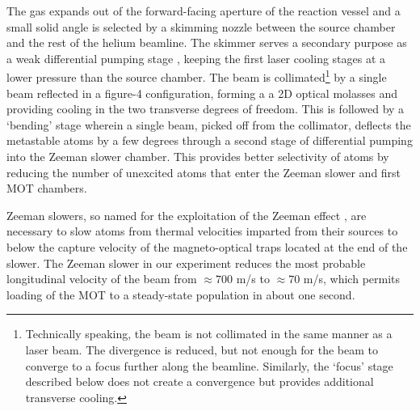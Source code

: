 	The gas expands out of the forward-facing aperture of the reaction vessel and a small solid angle is selected by a skimming nozzle between the source chamber and the rest of the helium beamline.
	The skimmer serves a secondary purpose as a weak differential pumping stage , keeping the first laser cooling stages at a lower pressure than the source chamber.
	The beam is collimated\footnote{Technically speaking, the beam is not collimated in the same manner as a laser beam.
	The divergence is reduced, but not enough for the beam to converge to a focus further along the beamline.
	Similarly, the `focus' stage described below does not create a convergence but provides additional transverse cooling.} by a single beam reflected in a figure-4 configuration, forming a a 2D optical molasses\cite{Lett81,rooijakkers96} and providing cooling in the two transverse degrees of freedom.
	This is followed by a `bending' stage wherein a single beam, picked off from the collimator, deflects the metastable atoms by a few degrees through a second stage of differential pumping into the Zeeman slower chamber.
	This provides better selectivity of \mhe atoms by reducing the number of unexcited atoms that enter the Zeeman slower and first MOT chambers.

	Zeeman slowers, so named for the exploitation of the Zeeman effect , are necessary to slow atoms from thermal velocities imparted from their sources to below the capture velocity of the magneto-optical traps located at the end of the slower.
	The Zeeman slower in our experiment \cite{dedman04}  reduces the most probable longitudinal velocity of the beam from $\approx700$ m/s to $\approx70$ m/s, which permits loading of the MOT to a steady-state population in about one second.

